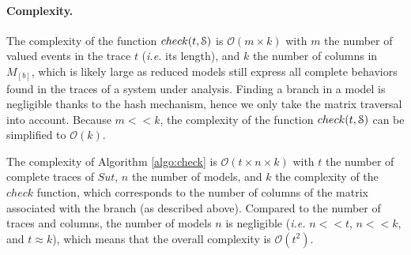 \paragraph{Complexity.}
The complexity of the function $check(t, \EuScript{S})$ is
$\mathcal{O}(m \times k)$ with $m$ the number of valued events in
the trace $t$ (\emph{i.e.} its length), and $k$ the number of
columns in $M_{[b]}$, which is likely large as reduced models
still express all complete behaviors found in the traces of a
system under analysis. Finding a branch in a model is negligible
thanks to the hash mechanism, hence we only take the matrix
traversal into account. Because $m << k$, the complexity of the
function $check(t, \EuScript{S})$ can be simplified to
$\mathcal{O}(k)$.

The complexity of Algorithm \ref{algo:check} is $\mathcal{O}(t
\times n \times k)$ with $t$ the number of complete traces of
$\mathit{Sut}$, $n$ the number of models, and $k$ the complexity
of the $check$ function, which corresponds to the number of
columns of the matrix associated with the branch (as described
above). Compared to the number of traces and columns, the number
of models $n$ is negligible (\emph{i.e.} $n << t$, $n << k$, and
$t \approx k$), which means that the overall complexity is
$\mathcal{O}(t^2)$.

\clearpage
